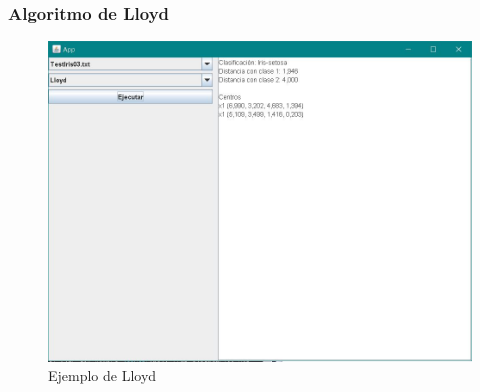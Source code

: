 \documentclass[12pt]{article}
\begin{document}
\subsubsection{Algoritmo de Lloyd}
\begin{figure}[H]
    \centering
    \includegraphics[width=1\textwidth]{lloyd.JPG}
    \caption{Ejemplo de Lloyd}
\end{figure}
\end{document}
